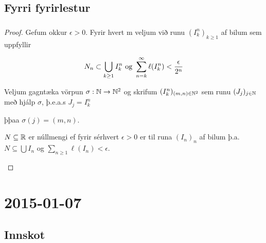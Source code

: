 \documentclass[12pt]{book}
\begin{document}
\section{Fyrri fyrirlestur}

\subsection{}
\begin{proof}

Gefum okkur $\epsilon > 0$. Fyrir hvert m veljum við runu $(I^n_k)_{k \geq 1}$ af bilum sem uppfyllir

\[N_n \subset \bigcup_{k \geq 1} I_k^n \text{ og } \sum_{n = {k}}^{\infty} \ell(I^n_k) < \frac{\epsilon}{2^n}\]

Veljum gagntæka vörpun $\sigma: \mathbb{N} \to \mathbb{N}^2$ og skrifum $(I^n_k)_{(m,n) \in \mathbb{N}^2}$ sem runu
$(J_j)_{j \in \mathbb{N}}$ með hjálp $\sigma$, þ.e.a.s $J_j = I^n_k$

þþaa $\sigma (j) = (m,n)$.

\begin{ath}
$N \subseteq \mathbb{R}$ er núllmengi ef fyrir sérhvert $\epsilon > 0$ er til runa $(I_n)_{n}$ af bilum þ.a.
$N \subseteq \bigcup I_n$ og $\sum_{n \geq 1} \ell(I_n) < \epsilon$.

\end{ath}
\end{proof}
\chapter{2015-01-07}

\section*{Innskot}
\end{document}
